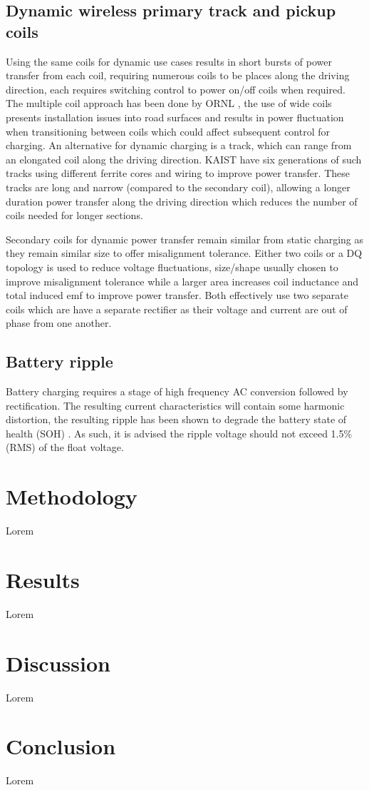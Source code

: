 \documentclass[conference]{IEEEtran}
\begin{document}
\subsection{Dynamic wireless primary track and pickup coils}
Using the same coils for dynamic use cases results in short bursts of power transfer from each coil, requiring numerous coils to be places along the driving direction, each requires switching control to power on/off coils when required. The multiple coil approach has been done by ORNL \cite{dwc_coils1}, the use of wide coils presents installation issues into road surfaces and results in power fluctuation when transitioning between coils which could affect subsequent control for charging.
An alternative for dynamic charging  is a track, which can range from an elongated coil along the driving direction. KAIST have six generations of such tracks \cite{dwc_coils2,dwc_coils3} using different ferrite cores and wiring to improve power transfer. These tracks are long and narrow (compared to the secondary coil), allowing a longer duration power transfer along the driving direction which reduces the number of coils needed for longer sections.

Secondary coils for dynamic power transfer remain similar from static charging as they remain similar size to offer misalignment tolerance. Either two coils \cite{dwc_coils4,dwc_coils5} or a DQ \cite{dwc_coils6} topology is used to reduce voltage fluctuations, size/shape usually chosen to improve misalignment tolerance while a larger area increases coil inductance and total induced emf to improve power transfer. Both effectively use two separate coils which are have a separate rectifier as their voltage and current are out of phase from one another.

\subsection{Battery ripple}
Battery charging requires a stage of high frequency AC conversion followed by rectification. The resulting current characteristics will contain some harmonic distortion, the resulting ripple has been shown to degrade the battery state of health (SOH) \cite{battery_ripple_2,battery_ripple_3,battery_ripple_4}. As such, it is advised the ripple voltage should not exceed 1.5\% (RMS) of the float  voltage\cite{battery_ripple_1}.

\section{Methodology}
Lorem

\section{Results}
Lorem

\section{Discussion}
Lorem

\section{Conclusion}
Lorem



\end{document}
